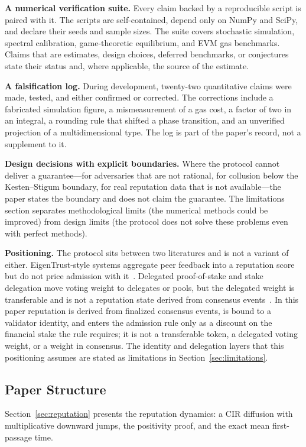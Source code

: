 \documentclass[11pt,a4paper]{article}
\numberwithin{equation}{section}
\numberwithin{table}{section}
\begin{document}
\textbf{A numerical verification suite.} Every claim backed by a reproducible script is paired with it. The scripts are self-contained, depend only on NumPy and SciPy, and declare their seeds and sample sizes. The suite covers stochastic simulation, spectral calibration, game-theoretic equilibrium, and EVM gas benchmarks. Claims that are estimates, design choices, deferred benchmarks, or conjectures state their status and, where applicable, the source of the estimate.

\textbf{A falsification log.} During development, twenty-two quantitative claims were made, tested, and either confirmed or corrected. The corrections include a fabricated simulation figure, a mismeasurement of a gas cost, a factor of two in an integral, a rounding rule that shifted a phase transition, and an unverified projection of a multidimensional type. The log is part of the paper's record, not a supplement to it.

\textbf{Design decisions with explicit boundaries.} Where the protocol cannot deliver a guarantee---for adversaries that are not rational, for collusion below the Kesten--Stigum boundary, for real reputation data that is not available---the paper states the boundary and does not claim the guarantee. The limitations section separates methodological limits (the numerical methods could be improved) from design limits (the protocol does not solve these problems even with perfect methods).

\textbf{Positioning.} The protocol sits between two literatures and is not a variant of either. EigenTrust-style systems aggregate peer feedback into a reputation score but do not price admission with it~\cite{kamvar2003}. Delegated proof-of-stake and stake delegation move voting weight to delegates or pools, but the delegated weight is transferable and is not a reputation state derived from consensus events~\cite{larimer2014,goodman2014}. In this paper reputation is derived from finalized consensus events, is bound to a validator identity, and enters the admission rule only as a discount on the financial stake the rule requires; it is not a transferable token, a delegated voting weight, or a weight in consensus. The identity and delegation layers that this positioning assumes are stated as limitations in Section~\ref{sec:limitations}.

\subsection{Paper Structure}
Section~\ref{sec:reputation} presents the reputation dynamics: a CIR diffusion with multiplicative downward jumps, the positivity proof, and the exact mean first-passage time.
\end{document}
